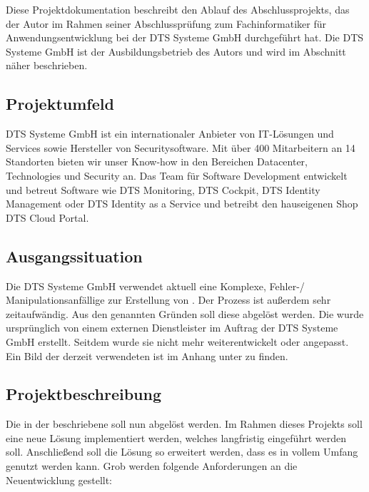 Diese Projektdokumentation beschreibt den Ablauf des Abschlussprojekts, das der Autor im Rahmen seiner Abschlussprüfung zum Fachinformatiker für Anwendungsentwicklung bei der DTS Systeme GmbH durchgeführt hat. Die DTS Systeme GmbH ist der Ausbildungsbetrieb des Autors und wird im Abschnitt  näher beschrieben.

\subsection{Projektumfeld}
\label{sec:Einführung-Definitionsphase:Projektumfeld}

DTS Systeme GmbH ist ein internationaler Anbieter von IT-Lösungen und Services sowie Hersteller von Securitysoftware. Mit über 400 Mitarbeitern an 14 Standorten bieten wir unser Know-how in den Bereichen Datacenter, Technologies und Security an.
Das Team für Software Development entwickelt und betreut Software wie DTS Monitoring, DTS Cockpit, DTS Identity Management oder DTS Identity as a Service und betreibt den hauseigenen Shop DTS Cloud Portal.

\subsection{Ausgangssituation}
\label{sec:Einführung-Definitionsphase:Ausgangssituation}

Die DTS Systeme GmbH verwendet aktuell eine Komplexe, Fehler-/ Manipulationsanfällige  zur Erstellung von . Der Prozess ist außerdem sehr zeitaufwändig. Aus den genannten Gründen soll diese  abgelöst werden.
Die  wurde ursprünglich von einem externen Dienstleister im Auftrag der DTS Systeme GmbH erstellt. Seitdem wurde sie nicht mehr weiterentwickelt oder angepasst.
Ein Bild der derzeit verwendeten  ist im Anhang unter  zu finden.


\subsection{Projektbeschreibung}
\label{sec:Einführung-Definitionsphase:Projektbeschreibung}

Die in der  beschriebene  soll nun abgelöst werden.
Im Rahmen dieses Projekts soll eine neue Lösung implementiert werden, welches langfristig eingeführt werden soll. Anschließend soll die Lösung so erweitert werden, dass es in vollem Umfang genutzt werden kann.
Grob werden folgende Anforderungen an die Neuentwicklung gestellt:

